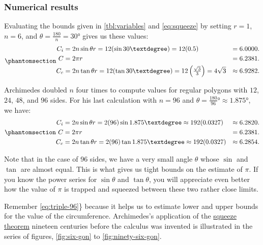 \documentclass[
  a4paper,
]{article}
\begin{document}
\subsubsection{Numerical results}\label{numerical-results}

Evaluating the bounds given in \cref{tbl:variables} and
\cref{eq:squeeze} by setting \(r = 1\), \(n = 6\), and
\(\theta = \frac{180}{n} = 30°\) gives us these values:
\begin{equation}\phantomsection\label{eq:triple-6}{
\begin{aligned}
C_i &= 2n\sin\theta r = 12(\sin 30°) = 12(0.5) &= 6.0000.\\
C &= 2\pi r &= 6.2381.\\
C_c &= 2n\tan\theta r = 12(\tan 30°) = 12\left(\tfrac{\sqrt{3}}{3}\right) = 4\sqrt{3} &\approx 6.9282.\\
\end{aligned}
}\end{equation}

Archimedes doubled \(n\) four times to compute values for regular
polygons with \(12\), \(24\), \(48\), and \(96\) sides. For his last
calculation with \(n = 96\) and
\(\theta = \tfrac{180}{96}° \approx 1.875°\), we have:
\begin{equation}\phantomsection\label{eq:triple-96}{
\begin{aligned}
C_i &= 2n\sin\theta r = 2(96)\sin{1.875°} \approx 192(0.0327) &\approx 6.2820.\\
C &= 2\pi r &= 6.2381.\\
C_c &= 2n\tan\theta r = 2(96)\tan{1.875°} \approx 192(0.0327) &\approx 6.2854.\\
\end{aligned}
}\end{equation}

Note that in the case of 96 sides, we have a very small angle \(\theta\)
whose \(\sin\) and \(\tan\) are almost equal. This is what gives us
tight bounds on the estimate of \(\pi\). If you know the power series
for \(\sin\theta\) and \(\tan\theta\), you will appreciate even better
how the value of \(\pi\) is trapped and squeezed between these two
rather close limits.

Remember \cref{eq:triple-96}\} because it helps us to estimate lower and
upper bounds for the value of the circumference. Archimedes's
application of the
\href{https://en.wikipedia.org/wiki/Squeeze_theorem}{squeeze theorem}
nineteen centuries before the calculus was invented is illustrated in
the series of figures, \cref{fig:six-gon} to \cref{fig:ninety-six-gon}.
\end{document}
